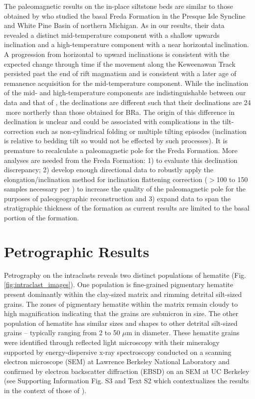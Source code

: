 \documentclass[draft]{agujournal2019}
\begin{document}
The paleomagnetic results on the in-place siltstone beds are similar to those obtained by  who studied the basal Freda Formation in the Presque Isle Syncline and White Pine Basin of northern Michigan. As in our results, their data revealed a distinct mid-temperature component with a shallow upwards inclination and a high-temperature component with a near horizontal inclination. A progression from horizontal to upward inclinations is consistent with the expected change through time if the movement along the Keweenawan Track persisted past the end of rift magmatism \cite{Fairchild2017a, Swanson-Hysell2019a} and is consistent with a later age of remanence acquisition for the mid-temperature component. While the inclination of the mid- and high-temperature components are indistinguishable between our data and that of , the declinations are different such that their declinations are 24\textdegree$\;$more northerly than those obtained for BRa. The origin of this difference in declination is unclear and could be associated with complications in the tilt-correction such as non-cylindrical folding or multiple tilting episodes (inclination is relative to bedding tilt so would not be effected by such processes). It is premature to recalculate a paleomagnetic pole for the Freda Formation. More analyses are needed from the Freda Formation: 1) to evaluate this declination discrepancy; 2) develop enough directional data to robustly apply the elongation/inclination method for inclination flattening correction ($>$100 to 150 samples necessary per \cite{Tauxe2008a}) to increase the quality of the paleomagnetic pole for the purposes of paleogeographic reconstruction and 3) expand data to span the stratigraphic thickness of the formation as current results are limited to the basal portion of the formation.

\section*{Petrographic Results}

Petrography on the intraclasts reveals two distinct populations of hematite (Fig. \ref{fig:intraclast_images}). One population is fine-grained pigmentary hematite present dominantly within the clay-sized matrix and rimming detrital silt-sized grains. The zones of pigmentary hematite within the matrix remain cloudy to high magnification indicating that the grains are submicron in size. The other population of hematite has similar sizes and shapes to other detrital silt-sized grains -- typically ranging from 2 to 50 $\mu$m in diameter. These hematite grains were identified through reflected light microscopy with their mineralogy supported by energy-dispersive x-ray spectroscopy conducted on a scanning electron microscope (SEM) at Lawrence Berkeley National Laboratory and confirmed by electron backscatter diffraction (EBSD) on an SEM at UC Berkeley (see Supporting Information Fig. S3 and Text S2 which contextualizes the results in the context of those of \cite{Elmore1982a,Vincenz1968a}). 
\end{document}
